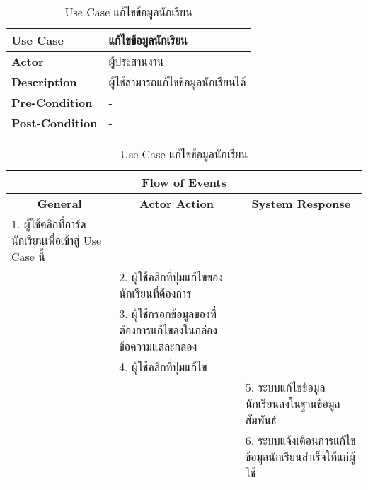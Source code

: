 \begin{table}[H]
    \caption{Use Case แก้ไขข้อมูลนักเรียน}
    \label{tab:usecase-edit-student}
    \begin{tabularx}{\textwidth}{ | p{3cm} | X | }
    \hline
    \textbf{Use Case} & แก้ไขข้อมูลนักเรียน \\
    \hline
    \textbf{Actor} & ผู้ประสานงาน \\
    \hline
    \textbf{Description} & ผู้ใช้สามารถแก้ไขข้อมูลนักเรียนได้ \\
    \hline
    \textbf{Pre-Condition} & - \\
    \hline
    \textbf{Post-Condition} & - \\
    \hline
    \end{tabularx}
    \begin{tabularx}{\textwidth}{ | X | X | X | }
    \multicolumn{3}{|c|}{\textbf{Flow of Events}} \\
    \hline
    \multicolumn{1}{|c|}{\textbf{General}} & \multicolumn{1}{|c|}{\textbf{Actor Action}} & \multicolumn{1}{|c|}{\textbf{System Response}} \\
    \hline
    1. ผู้ใช้คลิกที่การ์ดนักเรียนเพื่อเข้าสู่ Use Case นี้ & & \\
    \hline
    & 2. ผู้ใช้คลิกที่ปุ่มแก้ไขของนักเรียนที่ต้องการ & \\
    \hline
    & 3. ผู้ใช้กรอกข้อมูลของที่ต้องการแก้ไขลงในกล่องข้อความแต่ละกล่อง & \\
    \hline
    & 4. ผู้ใช้คลิกที่ปุ่มแก้ไข & \\
    \hline
    & & 5. ระบบแก้ไขข้อมูลนักเรียนลงในฐานข้อมูลสัมพันธ์ \\
    \hline
    & & 6. ระบบแจ้งเตือนการแก้ไขข้อมูลนักเรียนสำเร็จให้แก่ผู้ใช้ \\
    \hline
    \end{tabularx}
\end{table}
